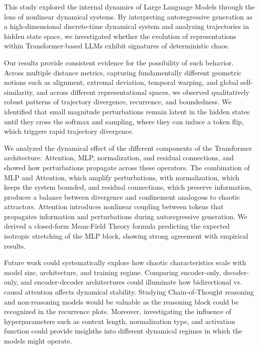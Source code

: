 \documentclass[a4paper,12pt]{article}
\begin{document}

    This study explored the internal dynamics of Large Language Models through the lens of nonlinear dynamical systems. By interpreting autoregressive generation as a high-dimensional discrete-time dynamical system and analyzing trajectories in hidden state space, we investigated whether the evolution of representations within Transformer-based LLMs exhibit signatures of deterministic chaos.

    Our results provide consistent evidence for the possibility of such behavior. Across multiple distance metrics, capturing fundamentally different geometric notions such as alignment, extremal deviation, temporal warping, and global self-similarity, and across different representational spaces, we observed qualitatively robust patterns of trajectory divergence, recurrence, and boundedness. We identified that small magnitude perturbations remain latent in the hidden states until they cross the softmax and sampling, where they can induce a token flip, which triggers rapid trajectory divergence.

    We analyzed the dynamical effect of the different components of the Transformer architecture: Attention, MLP, normalization, and residual connections, and showed how perturbations propagate across these operators. The combination of MLP and Attention, which amplify perturbations, with normalization, which keeps the system bounded, and residual connections, which preserve information, produces a balance between divergence and confinement analogous to chaotic attractors. Attention introduces nonlinear coupling between tokens that propagates information and perturbations during autoregressive generation. We derived a closed-form Mean-Field Theory formula predicting the expected isotropic stretching of the MLP block, showing strong agreement with empirical results.


    
    Future work could systematically explore how chaotic characteristics scale with model size, architecture, and training regime. Comparing encoder-only, decoder-only, and encoder-decoder architectures could illuminate how bidirectional vs. causal attention affects dynamical stability. Studying Chain-of-Thought reasoning and non-reasoning models would be valuable as the reasoning block could be recognized in the recurrence plots. Moreover, investigating the influence of hyperparameters such as context length, normalization type, and activation function could provide insighths into different dynamical regimes in which the models might operate.
    
\end{document}
